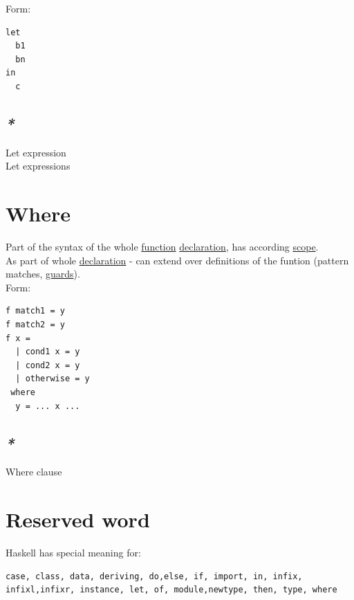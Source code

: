 \documentclass[a4paper,14pt,oneside]{book}
\begin{document}
Form:\\
\begin{verbatim}
let
  b1
  bn
in
  c
\end{verbatim}

\subsection{\emph{*}}
\label{sec:orge60a7df}

\label{orgd7d2602}Let expression\\
\label{org16c547b}Let expressions\\

\section{\label{org95b6103}Where}
\label{sec:orgff2220f}
Part of the syntax of the whole \hyperref[orgad0a745]{function} \hyperref[org76f358f]{declaration}, has according \hyperref[orgc03275b]{scope}.\\

As part of whole \hyperref[org76f358f]{declaration} - can extend over definitions of the funtion (pattern matches, \hyperref[orgf1ac800]{guards}).\\

Form:\\
\begin{verbatim}
f match1 = y
f match2 = y
f x =
  | cond1 x = y
  | cond2 x = y
  | otherwise = y
 where
  y = ... x ...
\end{verbatim}

\subsection{\emph{*}}
\label{sec:org180ddc0}

\label{orgb665eb3}Where clause\\

\section{\label{orgf2dd411}Reserved word}
\label{sec:orgd906a08}
Haskell has special meaning for:\\
\begin{verbatim}
case, class, data, deriving, do,else, if, import, in, infix, infixl,infixr, instance, let, of, module,newtype, then, type, where
\end{verbatim}
\end{document}
